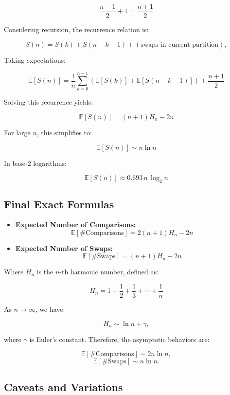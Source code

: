 \documentclass[pdflatex,sn-mathphys-num]{sn-jnl}%
\theoremstyle{thmstyleone}%
\theoremstyle{thmstyletwo}%
\theoremstyle{thmstylethree}%
\begin{document}
\begin{appendices}
\[
\frac{n - 1}{2} + 1 = \frac{n + 1}{2}
\]

Considering recursion, the recurrence relation is:

\[
S(n) = S(k) + S(n - k - 1) + \left( \text{swaps in current partition} \right),
\]

Taking expectations:

\[
\mathbb{E}[S(n)] = \frac{1}{n} \sum_{k=0}^{n-1} \left( \mathbb{E}[S(k)] + \mathbb{E}[S(n - k - 1)] \right) + \frac{n + 1}{2}
\]

Solving this recurrence yields:

\[
\boxed{
\mathbb{E}[S(n)] = (n + 1) H_n - 2n
}
\]

For large \( n \), this simplifies to:

\[
\mathbb{E}[S(n)] \sim n \ln n
\]

In base-2 logarithms:

\[
\mathbb{E}[S(n)] \approx 0.693\,n\,\log_2 n
\]

\subsection{Final Exact Formulas}

\begin{itemize}
    \item \textbf{Expected Number of Comparisons:}
    \[
    \boxed{
        \mathbb{E}[\text{\#Comparisons}] = 2(n + 1) H_n - 2n
    }
    \]
    
    \item \textbf{Expected Number of Swaps:}
    \[
    \boxed{
        \mathbb{E}[\text{\#Swaps}] = (n + 1) H_n - 2n
    }
    \]
\end{itemize}

Where \( H_n \) is the \( n \)-th harmonic number, defined as:

\[
H_n = 1 + \frac{1}{2} + \frac{1}{3} + \cdots + \frac{1}{n}
\]

As \( n \to \infty \), we have:

\[
H_n \sim \ln n + \gamma,
\]

where \( \gamma \) is Euler's constant. Therefore, the asymptotic behaviors are:

\[
\mathbb{E}[\text{\#Comparisons}] \sim 2n \ln n,
\]
\[
\mathbb{E}[\text{\#Swaps}] \sim n \ln n.
\]

\subsection{Caveats and Variations}


\end{appendices}
\end{document}
